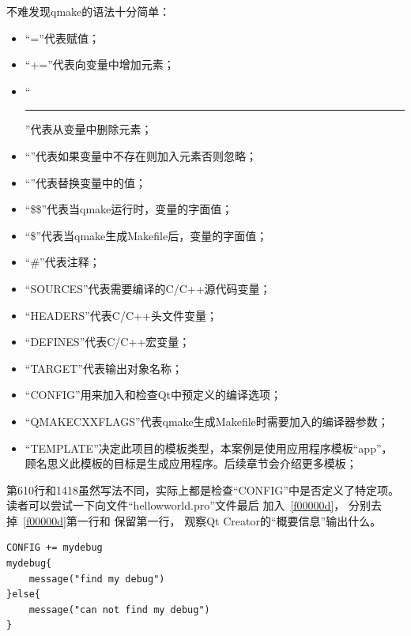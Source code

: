 不难发现qmake的语法十分简单：
\begin{itemize}
\item “{\sourcefonttwo{}=}”代表赋值；
\item “{\sourcefonttwo{}+}{\sourcefonttwo{}=}”代表向变量中增加元素；
\item “\hspace{0.05em}\rule[0.7ex]{0.4em}{0.65pt}\hspace{0.05em}{\sourcefonttwo{}=}”代表从变量中删除元素；
\item “\raisebox{-0.35ex}{\sourcefonttwo{}*}{\sourcefonttwo{}=}”代表如果变量中不存在则加入元素否则忽略；
\item “\raisebox{0.16ex}{\sourcefonttwo\~{}}{\sourcefonttwo{}=}”代表替换变量中的值；
\item “{\sourcefonttwo\$}{\sourcefonttwo\$}”代表当qmake运行时，变量的字面值；
\item “{\sourcefonttwo\$}”代表当qmake生成Makefile后，变量的字面值；
\item “{\sourcefonttwo\#}”代表注释；
\item “SOURCES”代表需要编译的C/C{\sourcefonttwo{}+}{\sourcefonttwo{}+}源代码变量；
\item “HEADERS”代表C/C{\sourcefonttwo{}+}{\sourcefonttwo{}+}头文件变量；
\item “DEFINES”代表C/C{\sourcefonttwo{}+}{\sourcefonttwo{}+}宏变量；
\item “TARGET”代表输出对象名称；
\item “CONFIG”用来加入和检查Qt中预定义的编译选项；
\item “QMAKE\underline{\hspace{0.5em}}CXXFLAGS”代表qmake生成Makefile时需要加入的编译器参数；
\item “TEMPLATE”决定此项目的模板类型，本案例是使用应用程序模板“app”，
顾名思义此模板的目标是生成应用程序。后续章节会介绍更多模板；
\end{itemize}

第6\raisebox{0.16ex}{\sourcefonttwo\~{}}10行和14\raisebox{0.16ex}{\sourcefonttwo\~{}}18虽然写法不同，实际上都是检查“CONFIG”中是否定义了特定项。
读者可以尝试一下向文件“hellow\underline{\hspace{0.5em}}world.pro”文件最后
加入\lstlistingname\ \ref{f00000d}，
分别去掉\lstlistingname\ \ref{f00000d}第一行和
保留第一行，
观察Qt Creator的“概要信息”输出什么。
\begin{lstlisting}[label=f00000d,
caption=GoodLuck,
title=\lstlistingname\ \thelstlisting
]
CONFIG += mydebug
mydebug{
    message("find my debug")
}else{
    message("can not find my debug")
}
\end{lstlisting}          %




